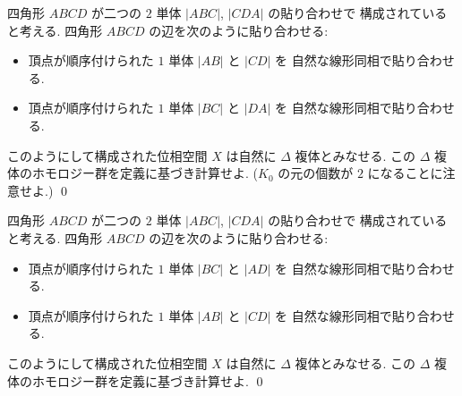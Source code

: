 \documentclass[12pt,twoside]{jarticle}
\begin{document}
\begin{question}[実射影平面]
 四角形 $ABCD$ が二つの $2$ 単体 $|ABC|$, $|CDA|$ の貼り合わせで
 構成されていると考える.
 四角形 $ABCD$ の辺を次のように貼り合わせる:
 \begin{itemize}
  \item 頂点が順序付けられた $1$ 単体 $|AB|$ と $|CD|$ を
    自然な線形同相で貼り合わせる.
  \item 頂点が順序付けられた $1$ 単体 $|BC|$ と $|DA|$ を
    自然な線形同相で貼り合わせる.
 \end{itemize}
 このようにして構成された位相空間 $X$ は自然に $\Delta$ 複体とみなせる.
 この $\Delta$ 複体のホモロジー群を定義に基づき計算せよ.
 ($K_0$ の元の個数が $2$ になることに注意せよ.)
 \qed
\end{question}

\begin{question}[Klein の壷]
 四角形 $ABCD$ が二つの $2$ 単体 $|ABC|$, $|CDA|$ の貼り合わせで
 構成されていると考える.
 四角形 $ABCD$ の辺を次のように貼り合わせる:
 \begin{itemize}
  \item 頂点が順序付けられた $1$ 単体 $|BC|$ と $|AD|$ を
    自然な線形同相で貼り合わせる.
  \item 頂点が順序付けられた $1$ 単体 $|AB|$ と $|CD|$ を
    自然な線形同相で貼り合わせる.
 \end{itemize}
 このようにして構成された位相空間 $X$ は自然に $\Delta$ 複体とみなせる.
 この $\Delta$ 複体のホモロジー群を定義に基づき計算せよ.
 \qed
\end{question}

\end{document}
